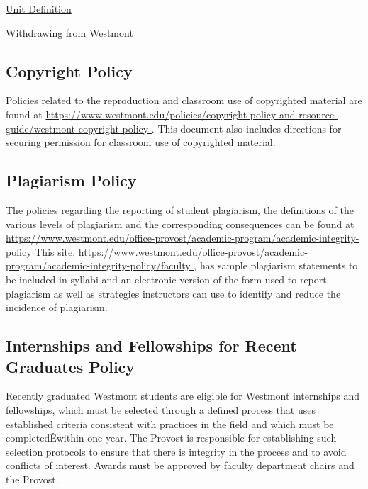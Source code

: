 		\href{https://www.westmont.edu/office-registrar/academic-policies-and-procedures/unit-definition} {Unit Definition}

		\href{https://www.westmont.edu/office-registrar/academic-policies-and-procedures/withdrawing-westmont-college} {Withdrawing from Westmont}



	\subsection{Copyright Policy}
		Policies related to the reproduction and classroom use of copyrighted
		material are found at
		\href{
			https://www.westmont.edu/policies/copyright-policy-and-resource-guide/westmont-copyright-policy
		}{\url{
				https://www.westmont.edu/policies/copyright-policy-and-resource-guide/westmont-copyright-policy
			}}
		.
		This document also includes directions for securing permission for classroom use of copyrighted material.
	\subsection{Plagiarism Policy}
		The policies regarding the reporting of student plagiarism, the definitions
		of the various levels of plagiarism and the corresponding consequences can be
		found at
		\href{
			https://www.westmont.edu/office-provost/academic-program/academic-integrity-policy
		}
		{\url{
				https://www.westmont.edu/office-provost/academic-program/academic-integrity-policy
			}}
		This site,
		\href{
			https://www.westmont.edu/office-provost/academic-program/academic-integrity-policy/faculty
		}
		{\url{
				https://www.westmont.edu/office-provost/academic-program/academic-integrity-policy/faculty
			}},
		has sample plagiarism statements to be included
		in syllabi and an electronic version of the form used to report plagiarism as well as strategies instructors can use to identify and reduce the incidence of plagiarism.
	\subsection{Internships and Fellowships for Recent Graduates Policy}
		Recently graduated Westmont students are eligible for Westmont internships and fellowships, which must be selected through a defined process that uses established criteria consistent with practices in the field and which must be completedÊwithin one year. The Provost is responsible for establishing such selection protocols to ensure that there is integrity in the process and to avoid conflicts of interest. Awards must be approved by faculty department chairs and the Provost.
